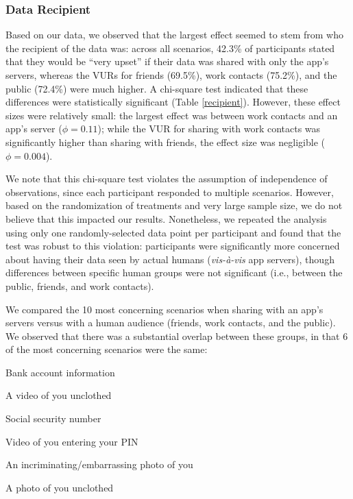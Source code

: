 \documentclass{acm_proc_article-sp}
\newenvironment{packed_enum}{
\begin{enumerate}
  \setlength{\itemsep}{1pt}
  \setlength{\parskip}{0pt}
  \setlength{\parsep}{0pt}
}{\end{enumerate}}
\begin{document}
\subsubsection{Data Recipient}
Based on our data, we observed that the largest effect seemed to stem from who the recipient of the data was: across all scenarios, 42.3\% of participants stated that they would be ``very upset'' if their data was shared with only the app's servers, whereas the VURs for friends (69.5\%), work contacts (75.2\%), and the public (72.4\%) were much higher. A chi-square test indicated that these differences were statistically significant (Table \ref{recipient}). However, these effect sizes were relatively small: the largest effect was between work contacts and an app's server ($\phi=0.11$); while the VUR for sharing with work contacts was significantly higher than sharing with friends, the effect size was negligible ($\phi=0.004$).

We note that this chi-square test violates the assumption of independence of observations, since each participant responded to multiple scenarios. However, based on the randomization of treatments and very large sample size, we do not believe that this impacted our results. Nonetheless, we repeated the analysis using only one randomly-selected data point per participant and found that the test was robust to this violation: participants were significantly more concerned about having their data seen by actual humans ({\it vis-{\`a}-vis} app servers), though differences between specific human groups were not significant (i.e., between the public, friends, and work contacts).


We compared the 10 most concerning scenarios when sharing with an app's servers versus with a human audience (friends, work contacts, and the public). We observed that there was a substantial overlap between these groups, in that 6 of the most concerning scenarios were the same:

\begin{packed_enum}
\item Bank account information
\item A video of you unclothed
\item Social security number
\item Video of you entering your PIN
\item An incriminating/embarrassing photo of you
\item A photo of you unclothed
\end{packed_enum}
\end{document}
